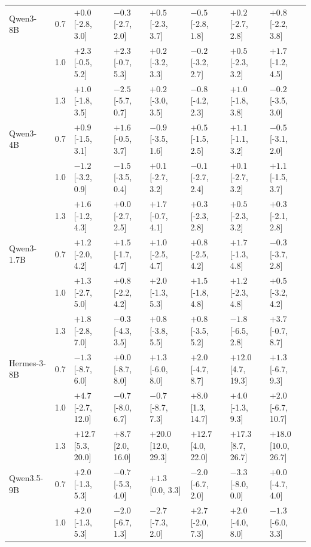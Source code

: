 \begin{tabular}{lcllllll}
\midrule
Qwen3-8B & 0.7 & $+0.0$ [-2.8, 3.0] & $-0.3$ [-2.7, 2.0] & $+0.5$ [-2.3, 3.7] & $-0.5$ [-2.8, 1.8] & $+0.2$ [-2.7, 2.8] & $+0.8$ [-2.2, 3.8] \\
 & 1.0 & $+2.3$ [-0.5, 5.2] & $+2.3$ [-0.7, 5.3] & $+0.2$ [-3.2, 3.3] & $-0.2$ [-3.2, 2.7] & $+0.5$ [-2.3, 3.2] & $+1.7$ [-1.2, 4.5] \\
 & 1.3 & $+1.0$ [-1.8, 3.5] & $-2.5$ [-5.7, 0.7] & $+0.2$ [-3.0, 3.5] & $-0.8$ [-4.2, 2.3] & $+1.0$ [-1.8, 3.8] & $-0.2$ [-3.5, 3.0] \\
\midrule
Qwen3-4B & 0.7 & $+0.9$ [-1.5, 3.1] & $+1.6$ [-0.5, 3.7] & $-0.9$ [-3.5, 1.6] & $+0.5$ [-1.5, 2.5] & $+1.1$ [-1.1, 3.2] & $-0.5$ [-3.1, 2.0] \\
 & 1.0 & $-1.2$ [-3.2, 0.9] & $-1.5$ [-3.5, 0.4] & $+0.1$ [-2.7, 3.2] & $-0.1$ [-2.7, 2.4] & $+0.1$ [-2.7, 3.2] & $+1.1$ [-1.5, 3.7] \\
 & 1.3 & $+1.6$ [-1.2, 4.3] & $+0.0$ [-2.7, 2.5] & $+1.7$ [-0.7, 4.1] & $+0.3$ [-2.3, 2.8] & $+0.5$ [-2.3, 3.2] & $+0.3$ [-2.1, 2.8] \\
\midrule
Qwen3-1.7B & 0.7 & $+1.2$ [-2.0, 4.2] & $+1.5$ [-1.7, 4.7] & $+1.0$ [-2.5, 4.7] & $+0.8$ [-2.5, 4.2] & $+1.7$ [-1.3, 4.8] & $-0.3$ [-3.7, 2.8] \\
 & 1.0 & $+1.3$ [-2.7, 5.0] & $+0.8$ [-2.2, 4.2] & $+2.0$ [-1.3, 5.3] & $+1.5$ [-1.8, 4.8] & $+1.2$ [-2.3, 4.8] & $+0.5$ [-3.2, 4.2] \\
 & 1.3 & $+1.8$ [-2.8, 7.0] & $-0.3$ [-4.3, 3.5] & $+0.8$ [-3.8, 5.5] & $+0.8$ [-3.5, 5.2] & $-1.8$ [-6.5, 2.8] & $+3.7$ [-0.7, 8.7] \\
\midrule
Hermes-3-8B & 0.7 & $-1.3$ [-8.7, 6.0] & $+0.0$ [-8.7, 8.0] & $+1.3$ [-6.0, 8.0] & $+2.0$ [-4.7, 8.7] & $\mathbf{+12.0}$ [4.7, 19.3] & $+1.3$ [-6.7, 9.3] \\
 & 1.0 & $+4.7$ [-2.7, 12.0] & $-0.7$ [-8.0, 6.7] & $-0.7$ [-8.7, 7.3] & $\mathbf{+8.0}$ [1.3, 14.7] & $+4.0$ [-1.3, 9.3] & $+2.0$ [-6.7, 10.7] \\
 & 1.3 & $\mathbf{+12.7}$ [5.3, 20.0] & $\mathbf{+8.7}$ [2.0, 16.0] & $\mathbf{+20.0}$ [12.0, 29.3] & $\mathbf{+12.7}$ [4.0, 22.0] & $\mathbf{+17.3}$ [8.7, 26.7] & $\mathbf{+18.0}$ [10.0, 26.7] \\
\midrule
Qwen3.5-9B & 0.7 & $+2.0$ [-1.3, 5.3] & $-0.7$ [-5.3, 4.0] & $+1.3$ [0.0, 3.3] & $-2.0$ [-6.7, 2.0] & $-3.3$ [-8.0, 0.0] & $+0.0$ [-4.7, 4.0] \\
 & 1.0 & $+2.0$ [-1.3, 5.3] & $-2.0$ [-6.7, 1.3] & $-2.7$ [-7.3, 2.0] & $+2.7$ [-2.0, 7.3] & $+2.0$ [-4.0, 8.0] & $-1.3$ [-6.0, 3.3] \\

\end{tabular}
